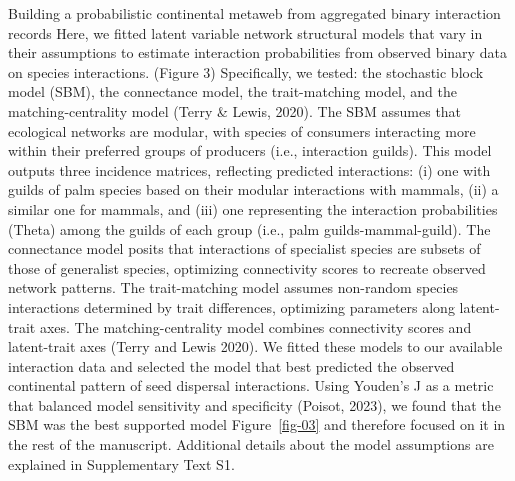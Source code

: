 \documentclass[
]{agujournal2019}
\begin{document}
Building a probabilistic continental metaweb from aggregated binary
interaction records Here, we fitted latent variable network structural
models that vary in their assumptions to estimate interaction
probabilities from observed binary data on species interactions. (Figure
3) Specifically, we tested: the stochastic block model (SBM), the
connectance model, the trait-matching model, and the matching-centrality
model (Terry \& Lewis, 2020). The SBM assumes that ecological networks
are modular, with species of consumers interacting more within their
preferred groups of producers (i.e., interaction guilds). This model
outputs three incidence matrices, reflecting predicted interactions: (i)
one with guilds of palm species based on their modular interactions with
mammals, (ii) a similar one for mammals, and (iii) one representing the
interaction probabilities (Theta) among the guilds of each group (i.e.,
palm guilds-mammal-guild). The connectance model posits that
interactions of specialist species are subsets of those of generalist
species, optimizing connectivity scores to recreate observed network
patterns. The trait-matching model assumes non-random species
interactions determined by trait differences, optimizing parameters
along latent-trait axes. The matching-centrality model combines
connectivity scores and latent-trait axes (Terry and Lewis 2020). We
fitted these models to our available interaction data and selected the
model that best predicted the observed continental pattern of seed
dispersal interactions. Using Youden's J as a metric that balanced model
sensitivity and specificity (Poisot, 2023), we found that the SBM was
the best supported model Figure~\ref{fig-03} and therefore focused on it
in the rest of the manuscript. Additional details about the model
assumptions are explained in Supplementary Text S1.
\end{document}
